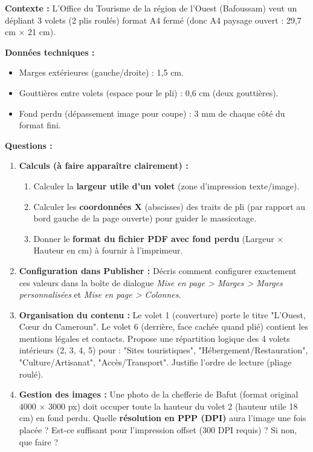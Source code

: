 \documentclass[11pt]{article}
\begin{document}
\begin{exercice}
\textbf{Contexte :} L'Office du Tourisme de la région de l'Ouest (Bafoussam) veut un dépliant 3 volets (2 plis roulés) format A4 fermé (donc A4 paysage ouvert : 29,7 cm $\times$ 21 cm).

\textbf{Données techniques :}
\begin{itemize}
    \item Marges extérieures (gauche/droite) : 1,5 cm.
    \item Gouttières entre volets (espace pour le pli) : 0,6 cm (deux gouttières).
    \item Fond perdu (dépassement image pour coupe) : 3 mm de chaque côté du format fini.
\end{itemize}

\textbf{Questions :}
\begin{enumerate}
    \item \textbf{Calculs (à faire apparaître clairement) :}
        \begin{enumerate}
            \item Calculer la \textbf{largeur utile d'un volet} (zone d'impression texte/image).
            \item Calculer les \textbf{coordonnées X} (abscisses) des traits de pli (par rapport au bord gauche de la page ouverte) pour guider le massicotage.
            \item Donner le \textbf{format du fichier PDF avec fond perdu} (Largeur $\times$ Hauteur en cm) à fournir à l'imprimeur.
        \end{enumerate}
    \item \textbf{Configuration dans Publisher :} Décris comment configurer exactement ces valeurs dans la boîte de dialogue \textit{Mise en page > Marges > Marges personnalisées} et \textit{Mise en page > Colonnes}.
    \item \textbf{Organisation du contenu :} Le volet 1 (couverture) porte le titre "L'Ouest, Cœur du Cameroun". Le volet 6 (derrière, face cachée quand plié) contient les mentions légales et contacts. Propose une répartition logique des 4 volets intérieurs (2, 3, 4, 5) pour : "Sites touristiques", "Hébergement/Restauration", "Culture/Artisanat", "Accès/Transport". Justifie l'ordre de lecture (pliage roulé).
    \item \textbf{Gestion des images :} Une photo de la chefferie de Bafut (format original 4000 $\times$ 3000 px) doit occuper toute la hauteur du volet 2 (hauteur utile 18 cm) en fond perdu. Quelle \textbf{résolution en PPP (DPI)} aura l'image une fois placée ? Est-ce suffisant pour l'impression offset (300 DPI requis) ? Si non, que faire ?
\end{enumerate}
\end{exercice}
\end{document}
